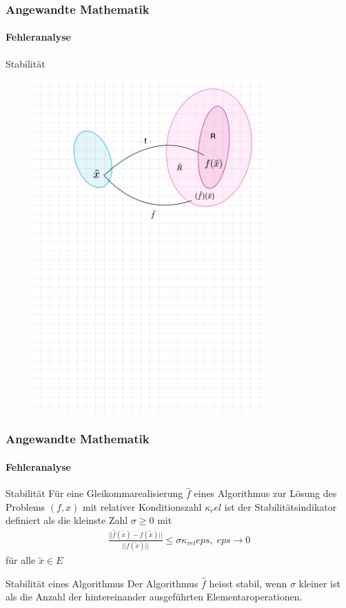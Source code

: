 \documentclass{beamer}
\begin{document}
\begin{frame}
    \frametitle{Angewandte Mathematik}
\framesubtitle{Fehleranalyse}
    \begin{block}{Stabilität}
\end{block}
\begin{figure}[H]
      \centering
    \includegraphics[width=0.8\textwidth]{images/stabilitaet}
      \caption{}
\end{figure}
 \end{frame}



\begin{frame}
    \frametitle{Angewandte Mathematik}
\framesubtitle{Fehleranalyse}
    \begin{block}{Stabilität}
Für eine Gleikommarealisierung $\hat{f}$ eines Algorithmus zur Lösung des Problems $(f,x)$ mit relativer Konditionszahl $\kappa_rel$ ist der Stabilitätsindikator definiert als die kleinste Zahl $\sigma \geq 0$ mit 
\begin{align*}
\frac{|| \hat{f}(\widetilde{x}) - f(\widetilde{x}) ||}{||f(\widetilde{x}) || } \leq \sigma  \kappa_{rel} eps , \; eps \to 0
\end{align*}
für alle $\widetilde{x} \in E$
\end{block}
    \begin{block}{Stabilität eines Algorithmus}
Der Algorithmus $\hat{f}$ heisst stabil, wenn $\sigma$ kleiner ist als die Anzahl der hintereinander ausgeführten Elementaroperationen. 
\end{block}
 \end{frame}
\end{document}
